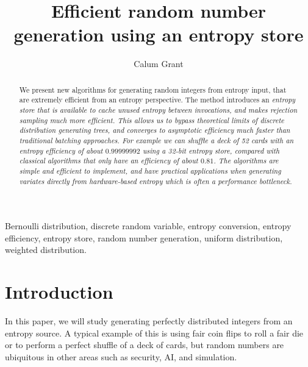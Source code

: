 \documentclass[lettersize,journal]{IEEEtran}
\begin{document}
\title{Efficient random number generation using an entropy store}
\author{Calum Grant}



\maketitle

\begin{abstract}
    We present new algorithms for generating random integers from entropy input, that are extremely efficient from an entropy perspective.
    The method introduces an \em entropy store \em that is available to cache unused entropy between invocations, and makes rejection sampling much more efficient.
    This allows us to bypass theoretical limits of discrete distribution generating trees, and converges to asymptotic efficiency much faster than traditional batching approaches.
    For example we can shuffle a deck of 52 cards with an entropy  efficiency of about $0.99999992$ using a 32-bit entropy store, compared with classical algorithms that only have an efficiency of about $0.81$. The algorithms are simple and efficient to implement, and have practical applications when generating variates directly from hardware-based entropy which is often a performance bottleneck.    
\end{abstract}

\begin{IEEEkeywords}
    Bernoulli distribution, discrete random variable, entropy conversion, entropy efficiency, entropy store, random number generation, uniform distribution, weighted distribution.
\end{IEEEkeywords}

\section{Introduction}

In this paper, we will study generating perfectly distributed integers from an entropy source. A typical example of this is using fair coin flips to roll a fair die or to perform a perfect shuffle of a deck of cards, but random numbers are ubiquitous in other areas such as security, AI, and simulation.
\end{document}
